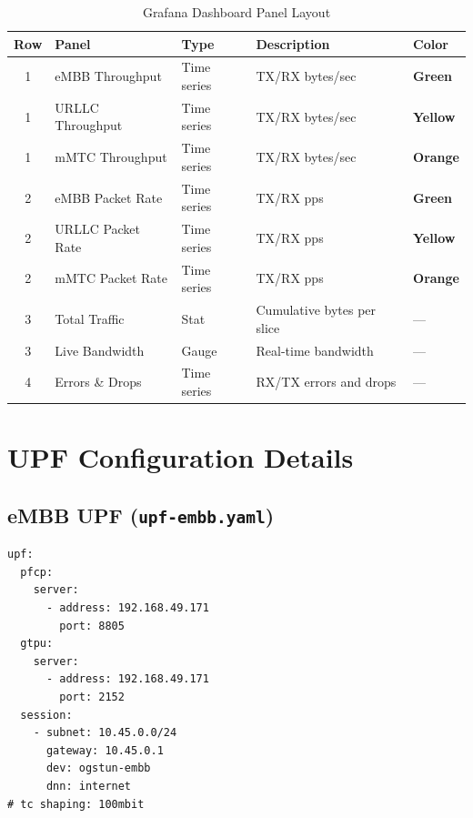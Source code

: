 \documentclass[12pt,a4paper]{article}
\begin{document}
\begin{table}[H]
\centering
\begin{tabular}{cllll}
\toprule
\textbf{Row} & \textbf{Panel} & \textbf{Type} & \textbf{Description} & \textbf{Color} \\
\midrule
1 & eMBB Throughput  & Time series & TX/RX bytes/sec  & \textcolor{embbgreen}{\textbf{Green}} \\
1 & URLLC Throughput & Time series & TX/RX bytes/sec  & \textcolor{urllcyellow}{\textbf{Yellow}} \\
1 & mMTC Throughput  & Time series & TX/RX bytes/sec  & \textcolor{mmtcorange}{\textbf{Orange}} \\
\midrule
2 & eMBB Packet Rate  & Time series & TX/RX pps  & \textcolor{embbgreen}{\textbf{Green}} \\
2 & URLLC Packet Rate & Time series & TX/RX pps  & \textcolor{urllcyellow}{\textbf{Yellow}} \\
2 & mMTC Packet Rate  & Time series & TX/RX pps  & \textcolor{mmtcorange}{\textbf{Orange}} \\
\midrule
3 & Total Traffic     & Stat  & Cumulative bytes per slice & — \\
3 & Live Bandwidth    & Gauge & Real-time bandwidth        & — \\
\midrule
4 & Errors \& Drops   & Time series & RX/TX errors and drops & — \\
\bottomrule
\end{tabular}
\caption{Grafana Dashboard Panel Layout}
\end{table}



\section{UPF Configuration Details}

\subsection{eMBB UPF (\texttt{upf-embb.yaml})}

\begin{lstlisting}[style=yaml]
upf:
  pfcp:
    server:
      - address: 192.168.49.171
        port: 8805
  gtpu:
    server:
      - address: 192.168.49.171
        port: 2152
  session:
    - subnet: 10.45.0.0/24
      gateway: 10.45.0.1
      dev: ogstun-embb
      dnn: internet
# tc shaping: 100mbit
\end{lstlisting}
\end{document}
